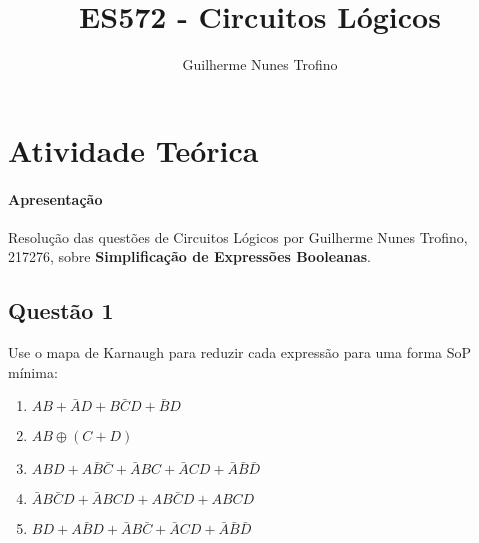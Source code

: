 \documentclass{article}
\title{ES572 - Circuitos Lógicos}
\author{Guilherme Nunes Trofino}
\begin{document}
    \maketitle
\newpage

    \section{Atividade Teórica}
        \paragraph{Apresentação}Resolução das questões de Circuitos Lógicos por Guilherme Nunes Trofino, 217276, sobre \textbf{Simplificação de Expressões Booleanas}.

        \subsection{Questão 1}
            \begin{exercise}
                Use o mapa de Karnaugh para reduzir cada expressão para uma forma SoP mínima:
                \begin{enumerate}[label=(\alph*), rightmargin = \leftmargin]
                    \item $AB + \bar{A}D + B\bar{C}D + \bar{B}D$
                    \item $AB \oplus (C+D)$
                    \item $ABD + A\bar{B}\bar{C} + \bar{A}BC + \bar{A}CD + \bar{A}\bar{B}\bar{D}$
                    \item $\bar{A}B\bar{C}D + \bar{A}BCD + AB\bar{C}D + ABCD$
                    \item $BD + A\bar{B}D + \bar{A}B\bar{C} + \bar{A}CD + \bar{A}\bar{B}\bar{D}$
                \end{enumerate}
            \end{exercise}
\end{document}
